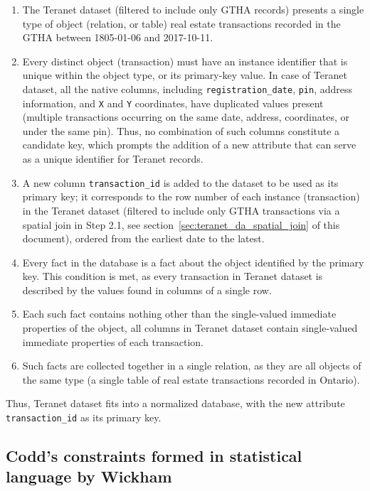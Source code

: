 \documentclass[11pt]{article}
\begin{document}
    \begin{enumerate}
        \item The Teranet dataset (filtered to include only GTHA records) presents a single type of object (relation, or table) \textemdash real estate transactions recorded in the GTHA between 1805-01-06 and 2017-10-11.
        \item Every distinct object (transaction) must have an instance identifier that is unique within the object type, or its primary-key value.
        In case of Teranet dataset, all the native columns, including \texttt{registration\_date}, \texttt{pin}, address information, and \texttt{X} and \texttt{Y} coordinates, have duplicated values present (multiple transactions occurring on the same date, address, coordinates, or under the same pin).
        Thus, no combination of such columns constitute a candidate key, which prompts the addition of a new attribute that can serve as a unique identifier for Teranet records.
        \item A new column \texttt{transaction\_id} is added to the dataset to be used as its primary key;
        it corresponds to the row number of each instance (transaction) in the Teranet dataset (filtered to include only GTHA transactions via a spatial join in Step 2.1, see section~\ref{sec:teranet_da_spatial_join} of this document), ordered from the earliest date to the latest.
        \item Every fact in the database is a fact about the object identified by the primary key.
        This condition is met, as every transaction in Teranet dataset is described by the values found in columns of a single row.
        \item Each such fact contains nothing other than the single-valued immediate properties of the object, all columns in Teranet dataset contain single-valued immediate properties of each transaction.
        \item Such facts are collected together in a single relation, as they are all objects of the same type (a single table of real estate transactions recorded in Ontario).
    \end{enumerate}

    Thus, Teranet dataset fits into a normalized database, with the new attribute \texttt{transaction\_id} as its primary key.

    \subsection{Codd's constraints formed in statistical language by Wickham} \label{subsec:teranet_tidy_data}
\end{document}
